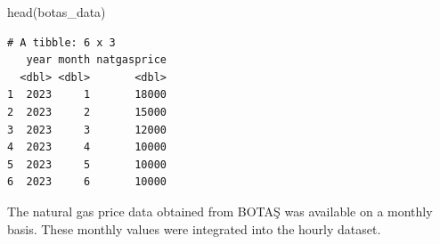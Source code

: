 \documentclass[
  11pt,
  a4paper,
]{article}
\newenvironment{Shaded}{\begin{snugshade}}{\end{snugshade}}
\newcommand{\FunctionTok}[1]{\textcolor[rgb]{0.28,0.35,0.67}{#1}}
\newcommand{\NormalTok}[1]{\textcolor[rgb]{0.00,0.23,0.31}{#1}}
\begin{document}
\begin{Shaded}
\begin{Highlighting}[]
\FunctionTok{head}\NormalTok{(botas\_data)}
\end{Highlighting}
\end{Shaded}

\begin{verbatim}
# A tibble: 6 x 3
   year month natgasprice
  <dbl> <dbl>       <dbl>
1  2023     1       18000
2  2023     2       15000
3  2023     3       12000
4  2023     4       10000
5  2023     5       10000
6  2023     6       10000
\end{verbatim}

The natural gas price data obtained from BOTAŞ was available on a
monthly basis. These monthly values were integrated into the hourly
dataset.
\end{document}
